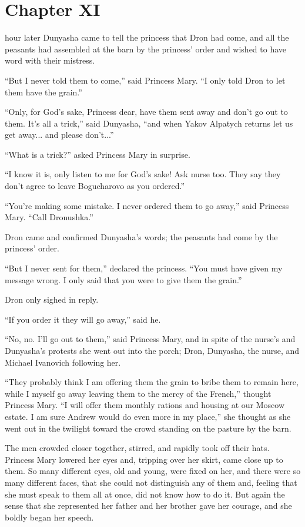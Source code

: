 \chapter*{Chapter XI} \ifaudio {}
\fi

 hour later Dunyasha came to tell the princess that Dron had
come, and all the peasants had assembled at the barn by the
princess' order and wished to have word with their mistress.

``But I never told them to come,'' said Princess Mary. ``I only
told Dron to let them have the grain.''

``Only, for God's sake, Princess dear, have them sent away and
don't go out to them. It's all a trick,'' said Dunyasha, ``and
when Yakov Alpatych returns let us get away... and please
don't...''

``What is a trick?'' asked Princess Mary in surprise.

``I know it is, only listen to me for God's sake! Ask nurse
too. They say they don't agree to leave Bogucharovo as you
ordered.''

``You're making some mistake. I never ordered them to go away,''
said Princess Mary. ``Call Dronushka.''

Dron came and confirmed Dunyasha's words; the peasants had come
by the princess' order.

``But I never sent for them,'' declared the princess. ``You must
have given my message wrong. I only said that you were to give
them the grain.''

Dron only sighed in reply.

``If you order it they will go away,'' said he.

``No, no. I'll go out to them,'' said Princess Mary, and in spite
of the nurse's and Dunyasha's protests she went out into the
porch; Dron, Dunyasha, the nurse, and Michael Ivanovich following
her.

``They probably think I am offering them the grain to bribe them
to remain here, while I myself go away leaving them to the mercy
of the French,'' thought Princess Mary. ``I will offer them
monthly rations and housing at our Moscow estate. I am sure
Andrew would do even more in my place,'' she thought as she went
out in the twilight toward the crowd standing on the pasture by
the barn.

The men crowded closer together, stirred, and rapidly took off
their hats. Princess Mary lowered her eyes and, tripping over her
skirt, came close up to them. So many different eyes, old and
young, were fixed on her, and there were so many different faces,
that she could not distinguish any of them and, feeling that she
must speak to them all at once, did not know how to do it. But
again the sense that she represented her father and her brother
gave her courage, and she boldly began her speech.

